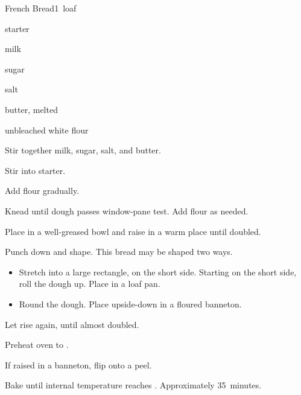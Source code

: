 \begin{recipe}{French Bread}{}{1~loaf}

\begin{ingredients}
\item {} starter
\item \C{\half} milk
\item {} sugar
\item {} salt
\item {} butter, melted
\item {} unbleached white flour
\end{ingredients}

\begin{directions}
\item Stir together milk, sugar, salt, and butter.
\item Stir into starter.
\item Add flour gradually.
\item Knead until dough passes window-pane test. Add flour as needed.
\item Place in a well-greased bowl and raise in a warm place until doubled.
\item Punch down and shape.
This bread may be shaped two ways.
\begin{itemize}
\item Stretch into a large rectangle,  on the short side. Starting on the short side, roll the dough up. Place in a loaf pan.
\item Round the dough. Place upside-down in a floured banneton.
\end{itemize}
\item Let rise again, until almost doubled.
\item Preheat oven to .
\item If raised in a banneton, flip onto a peel.
\item Bake until internal temperature reaches . Approximately 35~minutes.
\end{directions}

\end{recipe}
